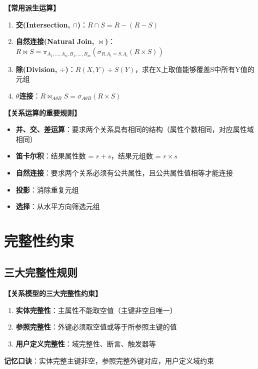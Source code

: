 \documentclass[12pt, a4paper]{article}
\newenvironment{bluebox}[1]{%
  \begin{trivlist}
  \item[\hskip\labelsep \textbf{#1}]
  \setlength{\parskip}{0.5ex}
  \setlength{\itemsep}{0.5ex}
}{%
  \end{trivlist}
}
\begin{document}
\begin{bluebox}{运算组合}
	\textbf{【常用派生运算】}

	\begin{enumerate}[leftmargin=*, label=\textbf{\arabic*.}]
		\item \textbf{交(Intersection, $\cap$)}：$R \cap S = R - (R - S)$
		\item \textbf{自然连接(Natural Join, $\Join$)}：$R \Join S = \pi_{A_1,...,A_n,B_1,...,B_m}(\sigma_{R.A_i=S.A_i}(R \times S))$
		\item \textbf{除(Division, $\div$)}：$R(X,Y) \div S(Y)$，求在X上取值能够覆盖S中所有Y值的元组
		\item \textbf{$\theta$连接}：$R \Join_{A \theta B} S = \sigma_{A \theta B}(R \times S)$
	\end{enumerate}
\end{bluebox}

\begin{bluebox}{运算规则}
	\textbf{【关系运算的重要规则】}

	\begin{itemize}
		\item \textbf{并、交、差运算}：要求两个关系具有相同的结构（属性个数相同，对应属性域相同）
		\item \textbf{笛卡尔积}：结果属性数 = $r + s$，结果元组数 = $r \times s$
		\item \textbf{自然连接}：要求两个关系必须有公共属性，且公共属性值相等才能连接
		\item \textbf{投影}：消除重复元组
		\item \textbf{选择}：从水平方向筛选元组
	\end{itemize}
\end{bluebox}

\section{完整性约束}

\subsection{三大完整性规则}

\begin{bluebox}{完整性约束}
	\textbf{【关系模型的三大完整性约束】}

	\begin{enumerate}[leftmargin=*, label=\textbf{\arabic*.}]
		\item \textbf{实体完整性}：主属性不能取空值（主键非空且唯一）
		\item \textbf{参照完整性}：外键必须取空值或等于所参照主键的值
		\item \textbf{用户定义完整性}：域完整性、断言、触发器等
	\end{enumerate}

	\textbf{记忆口诀}：实体完整主键非空，参照完整外键对应，用户定义域约束
\end{bluebox}
\end{document}
